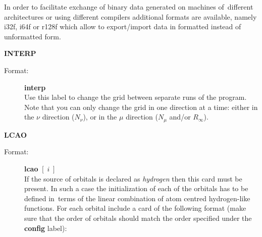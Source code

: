 \documentclass[12pt,a4paper]{article}
\begin{document}
\begin{description}
\begin{description}
  In order to facilitate exchange of binary data generated on machines of~different
  architectures or using different compilers additional formats are available, namely
  i32f, i64f or r128f which allow to export/import data in formatted instead of
  unformatted form.
\end{description}


\item \textbf{INTERP}
\begin{description}
\item[Format:] \textbf{interp} \\ Use this label to change the grid
  between separate runs of the program.  Note that you can only change
  the grid in one direction at a time: either in the $\nu$ direction
  ($N_\nu$), or in the $\mu$ direction ($N_\mu$ and/or $R_\infty$).
\end{description}




\item \textbf{LCAO}
\begin{description}
\item[Format:] \textbf{lcao} $[\;i\;]$\\ If the source of orbitals is declared as
  \textsl{hydrogen} then this card must be present. In such a case the initialization of
  each of the orbitals has to be defined in~terms of the linear combination of atom
  centred hydrogen-like functions. For each orbital include a card of the following format
  (make sure that the order of orbitals should match the order specified under the
  \textbf{config} label):


\end{description}
\end{description}
\end{document}
